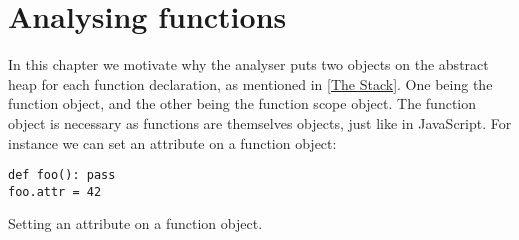\chapter{Analysing functions}
\label{Functions}
In this chapter we motivate why the analyser puts two objects on the abstract heap for each function declaration, as mentioned in \autoref{The Stack}. One being the function object, and the other being the function scope object. The function object is necessary as functions are themselves objects, just like in JavaScript. For instance we can set an attribute on a function object:

\begin{listing}[H]
	\begin{verbatim}
def foo(): pass
foo.attr = 42
	\end{verbatim}
\caption{Setting an attribute on a function object.}
\label{code:FunctionPropertyExample}
\end{listing}




%

